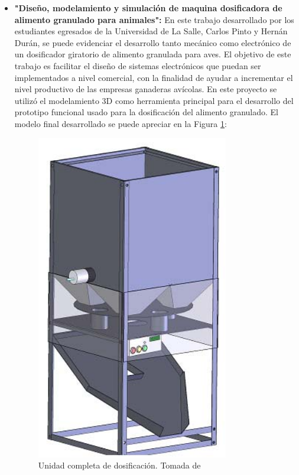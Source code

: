 \begin{itemize}
\item \textbf{"Diseño, modelamiento y simulación de maquina dosificadora de alimento granulado para animales":} En este trabajo desarrollado por los estudiantes egresados de la Universidad de La Salle, Carlos Pinto y Hernán Durán, se puede  evidenciar el desarrollo tanto mecánico como electrónico de un dosificador giratorio de alimento granulada para aves.  El objetivo de este trabajo es facilitar el diseño de sistemas electrónicos que puedan ser implementados a nivel comercial, con la finalidad de  ayudar a incrementar el nivel productivo de las empresas ganaderas avícolas. En este proyecto se utilizó el modelamiento 3D como herramienta principal para el desarrollo del prototipo funcional usado para la dosificación del alimento granulado. El modelo final desarrollado se puede apreciar en la Figura \ref{lasal}:
			\begin{figure}[H]
			\begin{center}
			 \includegraphics[scale=0.55]{img/lasal1png.png}
			\end{center}
			\caption{Unidad completa de dosificación. Tomada de \cite{pinturan} \label{lasal}}
			\end{figure}
			

\end{itemize}
